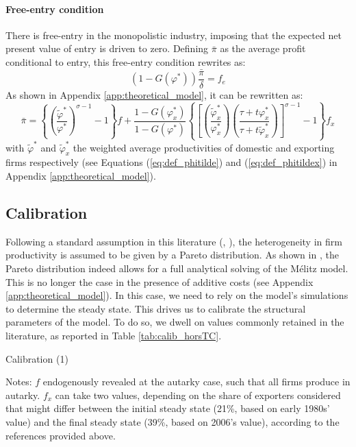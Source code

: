 \documentclass[a4paper,11pt]{article}
\begin{document}
\paragraph{Free-entry condition} There is free-entry in the monopolistic industry, imposing that the expected net present value of entry is driven to zero.
Defining $\bar{\pi}$ as the average profit conditional to entry, this free-entry condition rewrites as:
\begin{equation}
\left(1-G(\varphi^\ast)\right)\frac{\bar{\pi}}{\delta} = f_e \label{eq:FEC}
\end{equation}
As shown in Appendix \ref{app:theoretical_model}, it can be rewritten as:
\begin{equation}
\bar{\pi} = \left\{\left(\frac{\widetilde{\varphi}^\ast}{\varphi^\ast}\right)^{\sigma-1}-1 \right\}f +  \frac{1-G(\varphi_x^\ast)}{1-G(\varphi^\ast)}\left\{\left[\left(\frac{\widetilde{\varphi}_x^\ast}{\varphi_x^\ast}\right)\left(\frac{\tau+ t \varphi^\ast_x}{\tau+ t \widetilde{\varphi}^\ast_x}\right)\right]^{\sigma-1}-1 \right\}f_x \label{eq:ZCP}
\end{equation}
\noindent with $\widetilde{\varphi}^\ast$ and $\widetilde{\varphi}_x^\ast$ the weighted average productivities of domestic and exporting firms respectively (see Equations (\ref{eq:def_phitilde}) and (\ref{eq:def_phitildex}) in Appendix \ref{app:theoretical_model}).


\subsection{Calibration}

Following a standard assumption in this literature (\cite{Irrazabal_2015}, \cite{melitz-redding-Handbk-IT-2014}), the heterogeneity in firm productivity is assumed to be given by a Pareto distribution. As shown in \cite{melitz-redding-Handbk-IT-2014}, the Pareto distribution indeed allows for a full analytical solving of the M\'{e}litz model. This is no longer the case in the presence of additive costs (see Appendix \ref{app:theoretical_model}). In this case, we need to rely on the model's simulations to determine the steady state. This drives us to calibrate the structural parameters of the model. To do so, we dwell on values commonly retained in the literature, as reported in Table \ref{tab:calib_horsTC}.

\begin{table}[htb]
  \centering
  \caption{Calibration (1)} \label{tab:calib_horsTC}
\begin{center}
	
\end{center}
{\parbox[l]{13cm}{ \vspace{4pt}\footnotesize{Notes: $f$ endogenously revealed at the autarky case, such that all firms produce in autarky. $f_x$ can take two values, depending on the share of exporters considered that might differ between the initial steady state (21\%, based on early 1980s' value) and the final steady state (39\%, based on 2006's value), according to the references provided above.}}}
\end{table}
\end{document}

